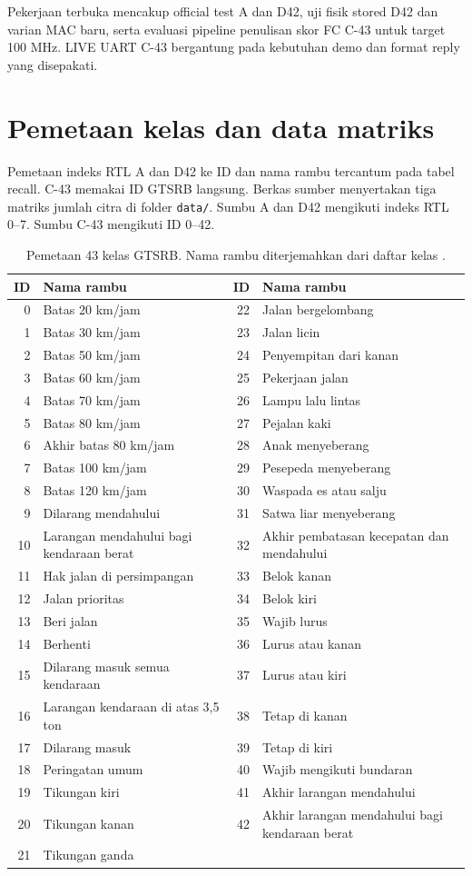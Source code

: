 \documentclass[11pt,a4paper]{article}
\begin{document}
Pekerjaan terbuka mencakup official test A dan D42, uji fisik stored
D42 dan varian MAC baru, serta evaluasi pipeline penulisan skor FC
C-43 untuk target 100 MHz. LIVE UART C-43 bergantung pada kebutuhan
demo dan format reply yang disepakati.

\appendix
\section{Pemetaan kelas dan data matriks}
Pemetaan indeks RTL A dan D42 ke ID dan nama rambu tercantum pada
tabel recall. C-43 memakai ID GTSRB langsung. Berkas sumber menyertakan
tiga matriks jumlah citra di folder \texttt{data/}. Sumbu A dan D42
mengikuti indeks RTL 0--7. Sumbu C-43 mengikuti ID 0--42.


\begin{table}[H]
\centering\small
\caption{Pemetaan 43 kelas GTSRB. Nama rambu diterjemahkan dari daftar kelas \cite{celen}.}
\begin{tabularx}{\linewidth}{rXrX}
\toprule
ID & Nama rambu & ID & Nama rambu \\
\midrule
0 & Batas 20 km/jam & 22 & Jalan bergelombang \\
1 & Batas 30 km/jam & 23 & Jalan licin \\
2 & Batas 50 km/jam & 24 & Penyempitan dari kanan \\
3 & Batas 60 km/jam & 25 & Pekerjaan jalan \\
4 & Batas 70 km/jam & 26 & Lampu lalu lintas \\
5 & Batas 80 km/jam & 27 & Pejalan kaki \\
6 & Akhir batas 80 km/jam & 28 & Anak menyeberang \\
7 & Batas 100 km/jam & 29 & Pesepeda menyeberang \\
8 & Batas 120 km/jam & 30 & Waspada es atau salju \\
9 & Dilarang mendahului & 31 & Satwa liar menyeberang \\
10 & Larangan mendahului bagi kendaraan berat & 32 & Akhir pembatasan kecepatan dan mendahului \\
11 & Hak jalan di persimpangan & 33 & Belok kanan \\
12 & Jalan prioritas & 34 & Belok kiri \\
13 & Beri jalan & 35 & Wajib lurus \\
14 & Berhenti & 36 & Lurus atau kanan \\
15 & Dilarang masuk semua kendaraan & 37 & Lurus atau kiri \\
16 & Larangan kendaraan di atas 3,5 ton & 38 & Tetap di kanan \\
17 & Dilarang masuk & 39 & Tetap di kiri \\
18 & Peringatan umum & 40 & Wajib mengikuti bundaran \\
19 & Tikungan kiri & 41 & Akhir larangan mendahului \\
20 & Tikungan kanan & 42 & Akhir larangan mendahului bagi kendaraan berat \\
21 & Tikungan ganda &  &  \\
\bottomrule
\end{tabularx}
\end{table}
\end{document}
